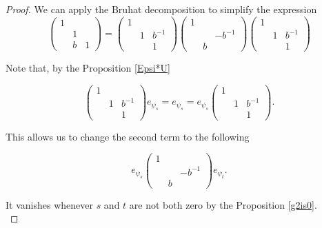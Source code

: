 \documentclass[12pt,reqno]{amsart}
\theoremstyle{definition}
\theoremstyle{remark}
\numberwithin{equation}{section}
\begin{document}
\begin{proof}
    We can apply the Bruhat decomposition to simplify the expression
    \[
    \begin{pmatrix}
        1 & & \\
        & 1 &\\
        & b & 1
    \end{pmatrix} = 
    \begin{pmatrix}
        1 & & \\
        & 1 & b^{-1}\\
        & & 1
    \end{pmatrix}
    \begin{pmatrix}
        1 & &\\
        & & -b^{-1}\\
        & b &
    \end{pmatrix}
    \begin{pmatrix}
        1 & &\\
        & 1 & b^{-1}\\
        & & 1
    \end{pmatrix}
    \]
    
    Note that, by the Proposition \ref{Epsi*U}

    \begin{equation*}
        \begin{pmatrix}
            1 & & \\
            & 1 & b^{-1}\\
            & & 1
        \end{pmatrix}
        e_{\psi_s} = e_{\psi_s} = e_{\psi_s}
        \begin{pmatrix}
            1 & & \\
            & 1 & b^{-1} \\
            & & 1
        \end{pmatrix}.
    \end{equation*}

    This allows us to change the second term to the following

    \begin{equation*}
        e_{\psi_s}
        \begin{pmatrix}
            1 & &\\
            &  & -b^{-1}\\
            & b & 
        \end{pmatrix} e_{\psi_t}.
    \end{equation*}

    It vanishes whenever $s$ and $t$ are not both zero by the Proposition \ref{g2is0}.\\


\end{proof}
\end{document}
